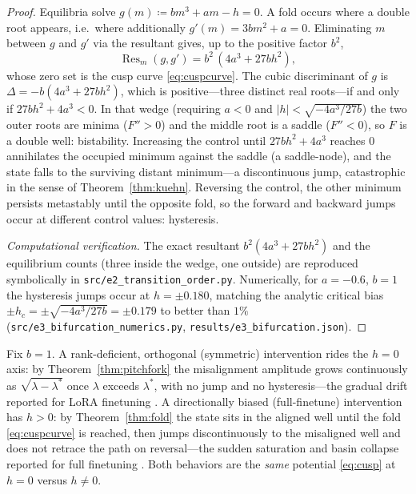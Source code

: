 \begin{proof}
Equilibria solve $g(m)\coloneqq bm^3+am-h=0$. A fold occurs where a double root appears, i.e.\
where additionally $g'(m)=3bm^2+a=0$. Eliminating $m$ between $g$ and $g'$ via the resultant
gives, up to the positive factor $b^2$,
\[
   \operatorname{Res}_m(g,g')=b^2\,(4a^3+27bh^2),
\]
whose zero set is the cusp curve \eqref{eq:cuspcurve}. The cubic discriminant of $g$ is
$\Delta=-b(4a^3+27bh^2)$, which is positive---three distinct real roots---if and only if
$27bh^2+4a^3<0$. In that wedge (requiring $a<0$ and $|h|<\sqrt{-4a^3/27b}$) the two outer roots
are minima ($F''>0$) and the middle root is a saddle ($F''<0$), so $F$ is a double well:
bistability. Increasing the control until $27bh^2+4a^3$ reaches $0$ annihilates the occupied
minimum against the saddle (a saddle-node), and the state falls to the surviving distant
minimum---a discontinuous jump, catastrophic in the sense of Theorem~\ref{thm:kuehn}. Reversing
the control, the other minimum persists metastably until the opposite fold, so the forward and
backward jumps occur at different control values: hysteresis.

\emph{Computational verification.} The exact resultant $b^2(4a^3+27bh^2)$ and the equilibrium
counts (three inside the wedge, one outside) are reproduced symbolically in
\texttt{src/e2\_transition\_order.py}. Numerically, for $a=-0.6$, $b=1$ the hysteresis jumps
occur at $h=\pm0.180$, matching the analytic critical bias $\pm h_c=\pm\sqrt{-4a^3/27b}=\pm0.179$
to better than $1\%$ (\texttt{src/e3\_bifurcation\_numerics.py},
\texttt{results/e3\_bifurcation.json}).
\end{proof}

\begin{example}\label{ex:regimes}
Fix $b=1$. A rank-deficient, orthogonal (symmetric) intervention rides the $h=0$ axis: by
Theorem~\ref{thm:pitchfork} the misalignment amplitude grows continuously as
$\sqrt{\lambda-\lambda^\ast}$ once $\lambda$ exceeds $\lambda^\ast$, with no jump and no
hysteresis---the gradual drift reported for LoRA finetuning \cite{nghiem2026trait}. A
directionally biased (full-finetune) intervention has $h>0$: by Theorem~\ref{thm:fold} the state
sits in the aligned well until the fold \eqref{eq:cuspcurve} is reached, then jumps
discontinuously to the misaligned well and does not retrace the path on reversal---the sudden
saturation and basin collapse reported for full finetuning
\cite{betley2025em,soligo2026em}. Both behaviors are the \emph{same} potential
\eqref{eq:cusp} at $h=0$ versus $h\neq0$.
\end{example}

